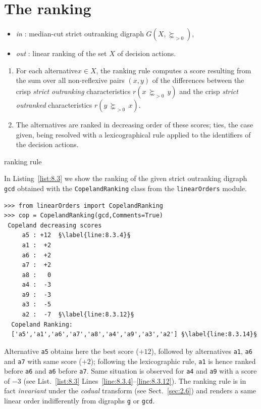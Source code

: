 \section{The \Copeland ranking}
\label{sec:8.2}

\begin{algorithm}[H]
    {\normalsize
\begin{itemize}
 \item [] \emph{in} : median-cut strict outranking digraph $G(X,\succnsim_{>0})$,
 \item [] \emph{out} : linear ranking of the set $X$ of decision actions.
\end{itemize}
  \begin{enumerate}
    \item For each alternative$x \in X$, the \Copeland ranking rule computes a score resulting from the sum over all non-reflexive pairs $(x,y)$  of the differences between the crisp \emph{strict outranking} characteristics $r(x\, \succnsim_{>0} \,y)$ and the crisp \emph{strict outranked} characteristics $r(y\, \succnsim_{>0} \, x)$.
    \item  The alternatives are ranked in decreasing order of these \Copeland scores; ties, the case given, being resolved with a lexicographical rule applied to the identifiers of the decision actions. 
    \end{enumerate}
    }
    \caption{\Copeland ranking rule \citep{COP-1951}}
\label{alg:8.1}
\end{algorithm}

In Listing~\vref{list:8.3} we show the ranking of the given strict outranking digraph \texttt{gcd} obtained with the \texttt{CopelandRanking} class from the \texttt{linearOrders} module. 
\begin{lstlisting}[caption={Computing a \Copeland Ranking},label=list:8.3]
>>> from linearOrders import CopelandRanking
>>> cop = CopelandRanking(gcd,Comments=True)
 Copeland decreasing scores
     a5 : +12  §\label{line:8.3.4}§
     a1 :  +2
     a6 :  +2
     a7 :  +2
     a8 :   0
     a4 :  -3
     a9 :  -3
     a3 :  -5
     a2 :  -7  §\label{line:8.3.12}§
  Copeland Ranking:
  ['a5','a1','a6','a7','a8','a4','a9','a3','a2'] §\label{line:8.3.14}§
\end{lstlisting}

Alternative \texttt{a5} obtains here the best \Copeland score ($+12$), followed by alternatives \texttt{a1}, \texttt{a6} and \texttt{a7} with same score ($+2$); following the lexicographic rule, \texttt{a1} is hence ranked before \texttt{a6} and \texttt{a6} before \texttt{a7}. Same situation is observed for \texttt{a4} and \texttt{a9} with a score of $-3$ (see List.~\vref{list:8.3} Lines~\ref{line:8.3.4}--\ref{line:8.3.12}). The \Copeland ranking rule is in fact \emph{invariant} under the \emph{codual} transform (see Sect.~\ref{sec:2.6}) and renders a same linear order indifferently from digraphs \texttt{g} or \texttt{gcd}.

